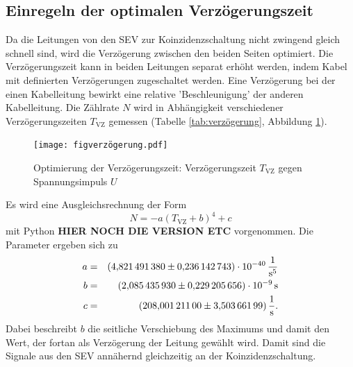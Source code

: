 \subsection{Einregeln der optimalen Verzögerungszeit}
Da die Leitungen von den SEV zur Koinzidenzschaltung nicht zwingend gleich schnell sind, wird die Verzögerung zwischen den beiden Seiten optimiert.
Die Verzögerungszeit kann in beiden Leitungen separat erhöht werden, indem Kabel mit definierten Verzögerungen zugeschaltet werden.
Eine Verzögerung bei der einen Kabelleitung bewirkt eine relative 'Beschleunigung' der anderen Kabelleitung.
Die Zählrate $N$ wird in Abhängigkeit verschiedener Verzögerungszeiten $T_{\text{VZ}}$ gemessen (Tabelle \ref{tab:verzögerung}, Abbildung \ref{fig:verzögerung}).

\begin{figure}[h!]
  \centering
  \texttt{[image: figverzögerung.pdf]}
  \caption{Optimierung der Verzögerungszeit: Verzögerungszeit $T_{\text{VZ}}$ gegen Spannungsimpuls $U$}
  \label{fig:verzögerung}
\end{figure}
Es wird eine Ausgleichsrechnung der Form
\begin{equation*}
  N = -a \left( T_{\text{VZ}} +b \right)^4+c
\end{equation*}
mit Python \textbf{HIER NOCH DIE VERSION ETC} vorgenommen.
Die Parameter ergeben sich zu
\begin{align*}
  a &=& \SI{4.82149138 \pm 0.236142743e-40}{\frac{1}{s^5}}\\
  b &=& \SI{2.08543593 \pm 0.229205656e-09}{s}\\
  c &=& \SI{208.001211 \pm 3.50366199}{\frac{1}{s}}.\\
\end{align*}
Dabei beschreibt $b$ die seitliche Verschiebung des Maximums und damit den Wert, der fortan als Verzögerung der Leitung gewählt wird.
Damit sind die Signale aus den SEV annähernd gleichzeitig an der Koinzidenzschaltung.
\FloatBarrier
